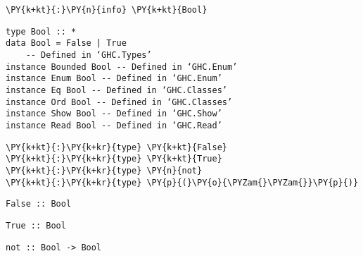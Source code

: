     \begin{tcolorbox}[breakable, size=fbox, boxrule=1pt, pad at break*=1mm,colback=cellbackground, colframe=cellborder, top=.75ex]
\begin{Verbatim}[commandchars=\\\{\}]
\PY{k+kt}{:}\PY{n}{info} \PY{k+kt}{Bool}
\end{Verbatim}
\end{tcolorbox}

    
    
    
    \begin{Verbatim}[commandchars=\\\{\}]
type Bool :: *
data Bool = False | True
  	-- Defined in ‘GHC.Types’
instance Bounded Bool -- Defined in ‘GHC.Enum’
instance Enum Bool -- Defined in ‘GHC.Enum’
instance Eq Bool -- Defined in ‘GHC.Classes’
instance Ord Bool -- Defined in ‘GHC.Classes’
instance Show Bool -- Defined in ‘GHC.Show’
instance Read Bool -- Defined in ‘GHC.Read’
    \end{Verbatim}

    
    \begin{tcolorbox}[breakable, size=fbox, boxrule=1pt, pad at break*=1mm,colback=cellbackground, colframe=cellborder, top=.75ex]
\begin{Verbatim}[commandchars=\\\{\}]
\PY{k+kt}{:}\PY{k+kr}{type} \PY{k+kt}{False}
\PY{k+kt}{:}\PY{k+kr}{type} \PY{k+kt}{True}
\PY{k+kt}{:}\PY{k+kr}{type} \PY{n}{not}
\PY{k+kt}{:}\PY{k+kr}{type} \PY{p}{(}\PY{o}{\PYZam{}\PYZam{}}\PY{p}{)}
\end{Verbatim}
\end{tcolorbox}

    
    \begin{Verbatim}[commandchars=\\\{\}]
False :: Bool
    \end{Verbatim}

    
    
    \begin{Verbatim}[commandchars=\\\{\}]
True :: Bool
    \end{Verbatim}

    
    
    \begin{Verbatim}[commandchars=\\\{\}]
not :: Bool -> Bool
    \end{Verbatim}

